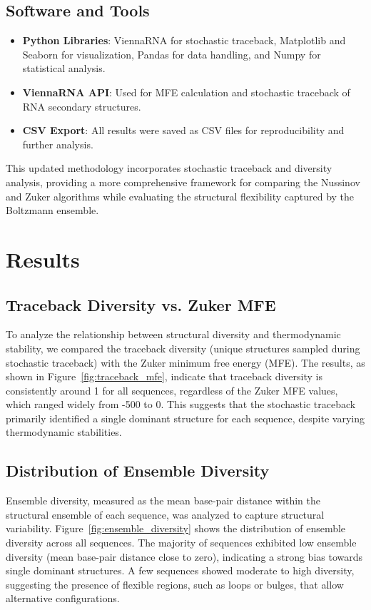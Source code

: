 \documentclass[10pt]{wlscirep}
\begin{document}
\subsection{Software and Tools}

\begin{itemize}
\item \textbf{Python Libraries}: ViennaRNA for stochastic traceback, Matplotlib and Seaborn for visualization, Pandas for data handling, and Numpy for statistical analysis.
\item \textbf{ViennaRNA API}: Used for MFE calculation and stochastic traceback of RNA secondary structures.
\item \textbf{CSV Export}: All results were saved as CSV files for reproducibility and further analysis.
\end{itemize}

This updated methodology incorporates stochastic traceback and diversity analysis, providing a more comprehensive framework for comparing the Nussinov and Zuker algorithms while evaluating the structural flexibility captured by the Boltzmann ensemble.

\section{Results}

\subsection{Traceback Diversity vs. Zuker MFE}
To analyze the relationship between structural diversity and thermodynamic stability, we compared the traceback diversity (unique structures sampled during stochastic traceback) with the Zuker minimum free energy (MFE). The results, as shown in Figure~\ref{fig:traceback_mfe}, indicate that traceback diversity is consistently around 1 for all sequences, regardless of the Zuker MFE values, which ranged widely from -500 to 0. This suggests that the stochastic traceback primarily identified a single dominant structure for each sequence, despite varying thermodynamic stabilities.

\subsection{Distribution of Ensemble Diversity}
Ensemble diversity, measured as the mean base-pair distance within the structural ensemble of each sequence, was analyzed to capture structural variability. Figure~\ref{fig:ensemble_diversity} shows the distribution of ensemble diversity across all sequences. The majority of sequences exhibited low ensemble diversity (mean base-pair distance close to zero), indicating a strong bias towards single dominant structures. A few sequences showed moderate to high diversity, suggesting the presence of flexible regions, such as loops or bulges, that allow alternative configurations.
\end{document}
